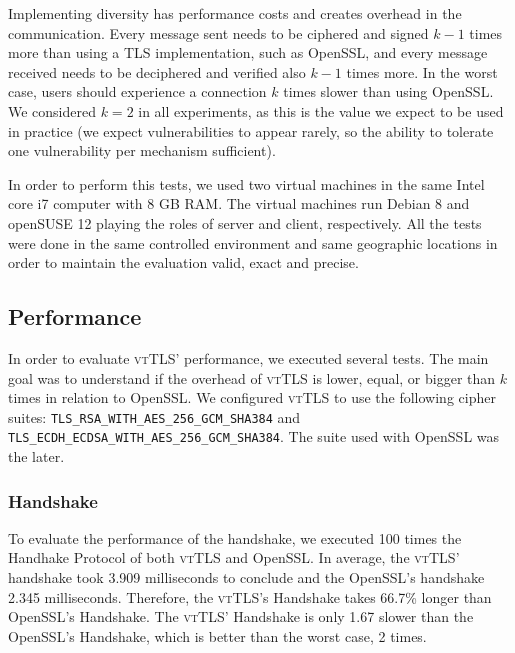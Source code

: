 \documentclass{sig-alternate-05-2015}
\newcommand{\suite}[1]{\texttt{{\footnotesize #1}}}
\begin{document}
Implementing diversity has performance costs and creates overhead in the communication. Every message sent needs to be ciphered and signed $k - 1$ times more than using a TLS implementation, such as OpenSSL, and every message received needs to be deciphered and verified also $k - 1$ times more. In the worst case, users should experience a connection $k$ times slower than using OpenSSL. We considered $k=2$ in all experiments, as this is the value we expect to be used in practice (we expect vulnerabilities to appear rarely, so the ability to tolerate one vulnerability per mechanism sufficient).

In order to perform this tests, we used two virtual machines in the same Intel core i7 computer with 8 GB RAM. The virtual machines run Debian 8 and openSUSE 12 playing the roles of server and client, respectively. All the tests were done in the same controlled environment and same geographic locations in order to maintain the evaluation valid, exact and precise.

\subsection{Performance}


In order to evaluate \textsc{vtTLS}' performance, we executed several tests. The main goal was to understand if the overhead of \textsc{vtTLS} is lower, equal, or bigger than $k$ times in relation to OpenSSL.
We configured \textsc{vtTLS} to use the following cipher suites:
\suite{TLS\_RSA\_WITH\_AES\_256\_GCM\_SHA384} and
\suite{TLS\_ECDH\_ECDSA\_WITH\_AES\_256\_GCM\_SHA384}. The suite used with OpenSSL was the later. 

\subsubsection{Handshake}

To evaluate the performance of the handshake, we executed 100 times the Handhake Protocol of both \textsc{vtTLS} and  OpenSSL.
In average, the \textsc{vtTLS}' handshake took 3.909 milliseconds to conclude and the OpenSSL's handshake 2.345 milliseconds. Therefore, the \textsc{vtTLS}'s Handshake takes 66.7\% longer than OpenSSL's Handshake. The \textsc{vtTLS}' Handshake is only 1.67 slower than the OpenSSL's Handshake, which is better than the worst case, 2 times.
\end{document}
